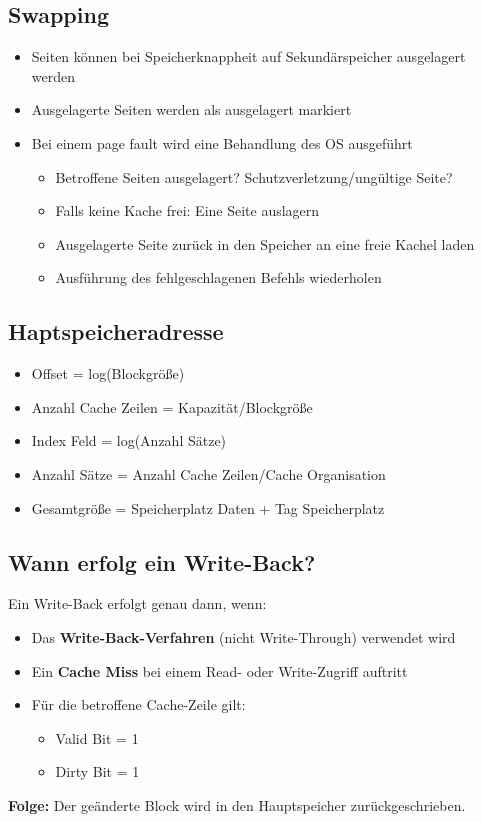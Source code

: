 \documentclass{kit}
\begin{document}
  \subsection{Swapping}
    \begin{itemize}
      \item Seiten können bei Speicherknappheit auf Sekundärspeicher ausgelagert werden
      \item Ausgelagerte Seiten werden als ausgelagert markiert
      \item Bei einem page fault wird eine Behandlung des OS ausgeführt
        \begin{itemize}
          \item Betroffene Seiten ausgelagert? Schutzverletzung/ungültige Seite?
          \item Falls keine Kache frei: Eine Seite auslagern
          \item Ausgelagerte Seite zurück in den Speicher an eine freie Kachel laden
          \item Ausführung des fehlgeschlagenen Befehls wiederholen
        \end{itemize}
    \end{itemize}
  \subsection{Haptspeicheradresse}
    \begin{itemize}
      \item Offset = log(Blockgröße)
      \item Anzahl Cache Zeilen = Kapazität/Blockgröße
      \item Index Feld = log(Anzahl Sätze)
      \item Anzahl Sätze = Anzahl Cache Zeilen/Cache Organisation
      \item Gesamtgröße = Speicherplatz Daten + Tag Speicherplatz
    \end{itemize}
  \subsection{Wann erfolg ein Write-Back?}
    Ein Write-Back erfolgt genau dann, wenn:
    \begin{itemize}
      \item Das \textbf{Write-Back-Verfahren} (nicht Write-Through) verwendet wird
      \item Ein \textbf{Cache Miss} bei einem Read- oder Write-Zugriff auftritt
      \item Für die betroffene Cache-Zeile gilt:
        \begin{itemize}
          \item Valid Bit = 1
          \item Dirty Bit = 1
        \end{itemize}
    \end{itemize}
    \textbf{Folge:} Der geänderte Block wird in den Hauptspeicher zurückgeschrieben.
\end{document}
